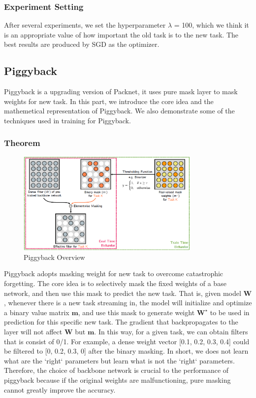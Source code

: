 \subsubsection{Experiment Setting}
After several experiments, we set the hyperparameter $\lambda$ = 100, which we think it is an appropriate value of how important the old task is to the new task. The best results are produced by SGD as the optimizer.


\subsection{Piggyback}
Piggyback is a upgrading version of Packnet, it uses pure mask layer to mask weights for new task. In this part, we introduce the core idea and the mathemetical representation of Piggyback. We also demonstrate some of the techniques used in training for Piggyback.

\subsubsection{Theorem}
\begin{figure}[h]
  \centering
  \includegraphics[width=0.8\textwidth]{figure/piggyback.png}
  \caption{Piggyback Overview}
  \label{piggy}
\end{figure}

Piggyback adopts masking weight for new task to overcome catastrophic forgetting. The core idea is to selectively mask the fixed weights of a base network, and then use this mask to predict the new task. That is, given model $\mathbf{W}$, whenever there is a new task streaming in, the model will initialize and optimize a binary value matrix $\mathbf{m}$, and use this mask to generate weight $\mathbf{W^\star}$ to be used in prediction for this specific new task. The gradient that backpropagates to the layer will not affect $\mathbf{W}$ but $\mathbf{m}$. In this way, for a given task, we can obtain filters that is consist of 0/1. For example, a dense weight vector [0.1, 0.2, 0.3, 0.4] could be filtered to [0, 0.2, 0.3, 0] after the binary masking. In short, we does not learn what are the `right` parameters but learn what is not the `right` parameters. Therefore, the choice of backbone network is crucial to the performance of piggyback because if the original weights are malfunctioning, pure masking cannot greatly improve the accuracy.

